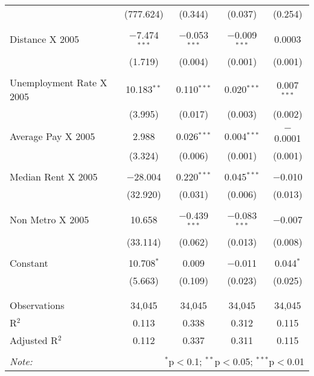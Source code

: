\documentclass[]{article}
\begin{document}
\begin{table}[!htbp]
\begin{tabular}{@{\extracolsep{5pt}}lcccc}
  & (777.624) & (0.344) & (0.037) & (0.254) \\ 
  & & & & \\ 
 Distance X 2005 & $-$7.474$^{***}$ & $-$0.053$^{***}$ & $-$0.009$^{***}$ & 0.0003 \\ 
  & (1.719) & (0.004) & (0.001) & (0.001) \\ 
  & & & & \\ 
 Unemployment Rate X 2005  & 10.183$^{**}$ & 0.110$^{***}$ & 0.020$^{***}$ & 0.007$^{***}$ \\ 
  & (3.995) & (0.017) & (0.003) & (0.002) \\ 
  & & & & \\ 
 Average Pay X 2005 & 2.988 & 0.026$^{***}$ & 0.004$^{***}$ & $-$0.0001 \\ 
  & (3.324) & (0.006) & (0.001) & (0.001) \\ 
  & & & & \\ 
 Median Rent X 2005 & $-$28.004 & 0.220$^{***}$ & 0.045$^{***}$ & $-$0.010 \\ 
  & (32.920) & (0.031) & (0.006) & (0.013) \\ 
  & & & & \\ 
 Non Metro X 2005 & 10.658 & $-$0.439$^{***}$ & $-$0.083$^{***}$ & $-$0.007 \\ 
  & (33.114) & (0.062) & (0.013) & (0.008) \\ 
  & & & & \\ 
 Constant & 10.708$^{*}$ & 0.009 & $-$0.011 & 0.044$^{*}$ \\ 
  & (5.663) & (0.109) & (0.023) & (0.025) \\ 
  & & & & \\ 
\hline \\[-1.8ex] 
Observations & 34,045 & 34,045 & 34,045 & 34,045 \\ 
R$^{2}$ & 0.113 & 0.338 & 0.312 & 0.115 \\ 
Adjusted R$^{2}$ & 0.112 & 0.337 & 0.311 & 0.115 \\ 
\hline 
\hline \\[-1.8ex] 
\textit{Note:}  & \multicolumn{4}{r}{$^{*}$p$<$0.1; $^{**}$p$<$0.05; $^{***}$p$<$0.01} \\ 
\end{tabular} 
\end{table}

\clearpage
\scriptsize
\end{document}
